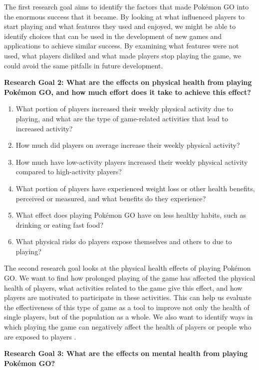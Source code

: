The first research goal aims to identify the factors that made Pokémon GO into the enormous success that it became. By looking at what influenced players to start playing and what features they used and enjoyed, we might be able to identify choices that can be used in the development of new games and applications to achieve similar success. By examining what features were not used, what players disliked and what made players stop playing the game, we could avoid the same pitfalls in future development.

\textbf{Research Goal 2: What are the effects on physical health from playing Pokémon GO, and how much effort does it take to achieve this effect?}

\begin{enumerate}
	\item What portion of players increased their weekly physical activity due to playing, and what are the type of game-related activities that lead to increased activity?
	\item How much did players on average increase their weekly physical activity?
	\item How much have low-activity players increased their weekly physical activity compared to high-activity players?
	\item What portion of players have experienced weight loss or other health benefits, perceived or measured, and what benefits do they experience?
	\item What effect does playing Pokémon GO have on less healthy  habits, such as drinking or eating fast food?
	\item What physical risks do players expose themselves and others to due to playing?
\end{enumerate}

The second research goal looks at the physical health effects of playing Pokémon GO. We want to find how prolonged playing of the game has affected the physical health of players, what activities related to the game give this effect, and how players are motivated to participate in these activities. This can help us evaluate the effectiveness of this type of game as a tool to improve not only the health of single players, but of the population as a whole. We also want to identify ways in which playing the game can negatively affect the health of players or people who are exposed to players .

\textbf{Research Goal 3: What are the effects on mental health from playing Pokémon GO?}

